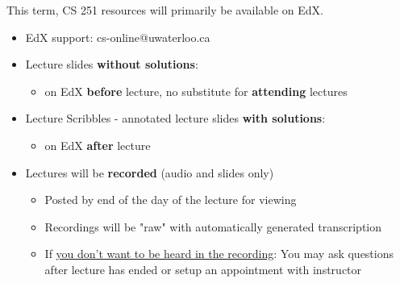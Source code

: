 \begin{frame}[fragile] 


  


This term, CS 251 resources will primarily be available on EdX. 

\begin{itemize} 

    \item EdX support: cs-online@uwaterloo.ca 



\item Lecture slides \textbf{without solutions}: 

\begin{itemize} 


\item on EdX \textbf{before} lecture, no substitute for \textbf{attending} lectures 

\end{itemize} 

\item Lecture Scribbles - annotated lecture slides \textbf{with solutions}: 

\begin{itemize} 

    \item on EdX \textbf{after} lecture 

\end{itemize} 

  

  

\item Lectures will be \textbf{recorded} (audio and slides only) 

\begin{itemize} 

    \item Posted by end of the day of the lecture for viewing 

    \item Recordings will be "raw" with automatically generated transcription 

\item If \underline{you don't want to be heard in the recording}: You may ask questions after lecture has ended or setup an appointment with instructor 


\end{itemize}
\end{itemize}
\end{frame}
